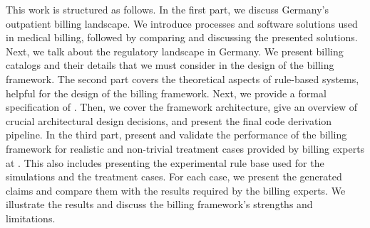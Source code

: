 This work is structured as follows.
In the first part, we discuss Germany's outpatient billing landscape.
We introduce processes and software solutions used in medical billing, followed by comparing and discussing the presented solutions.
Next, we talk about the regulatory landscape in Germany.
We present billing catalogs and their details that we must consider in the design of the billing framework.
The second part covers the theoretical aspects of rule-based systems, helpful for the design of the billing framework.
Next, we provide a formal specification of \RL.
Then, we cover the framework architecture, give an overview of crucial architectural design decisions, and present the final code derivation pipeline.
In the third part, present and validate the performance of the billing framework for realistic and non-trivial treatment cases provided by billing experts at \AV.
This also includes presenting the experimental rule base used for the simulations and the treatment cases.
For each case, we present the generated claims and compare them with the results required by the billing experts.
We illustrate the results and discuss the billing framework's strengths and limitations.
